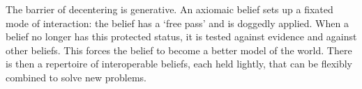 \documentclass[11pt]{article}
\begin{document}
The barrier of decentering is generative. An axiomaic belief sets up a fixated mode of interaction: the belief has a `free pass' and is doggedly applied. When a belief no longer has this protected status, it is tested against evidence and against other beliefs. This forces the belief to become a better model of the world. There is then a repertoire of interoperable beliefs, each held lightly, that can be flexibly combined to solve new problems.










\end{document}
